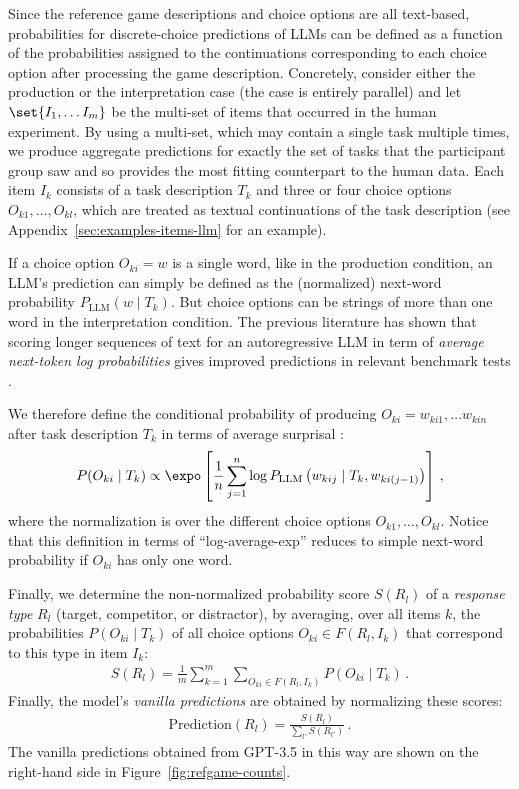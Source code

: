 \documentclass{article}
\begin{document}
Since the reference game descriptions and choice options are all text-based, probabilities for discrete-choice predictions of LLMs can be defined as a function of the probabilities assigned to the continuations corresponding to each choice option after processing the game description.
Concretely, consider either the production or the interpretation case (the case is entirely parallel) and let \(\set{I_1, \dots I_m}\) be the multi-set of items that occurred in the human experiment.
By using a multi-set, which may contain a single task multiple times, we produce aggregate predictions for exactly the set of tasks that the participant group saw and so provides the most fitting counterpart to the human data.
Each item $I_{k}$ consists of a task description $T_{k}$ and three or four choice options $O_{k1}, \dots, O_{kl}$, which are treated as textual continuations of the task description (see Appendix~\ref{sec:examples-items-llm} for an example).

If a choice option $O_{ki} = w$ is a single word, like in the production condition, an LLM's prediction can simply be defined as the (normalized) next-word probability $P_{\text{LLM}} (w \mid T_{k})$.
But choice options can be strings of more than one word in the interpretation condition.
The previous literature has shown that scoring longer sequences of text for an autoregressive LLM in term of \emph{average next-token log probabilities} gives improved predictions in relevant benchmark tests \citep[e.g.,][]{BrownMann2020:Language-Models}.

We therefore define the conditional probability of producing $O_{ki} = w_{ki1}, \dots w_{kin}$ after task description $T_{k}$ in terms of average surprisal :
%
\begin{align*}
P(O_{ki} \mid T_{k}) \propto \expo \left [  \frac{1}{n} \sum_{j=1}^n \log P_{\text{LLM}} \left(w_{kij} \mid T_{k}, w_{ki(j-1)} \right) \right ] \,,
\end{align*}
%
where the normalization is over the different choice options $O_{k1}, \dots, O_{kl}$.
Notice that this definition in terms of ``log-average-exp'' reduces to simple next-word probability if $O_{ki}$ has only one word.


Finally, we determine the non-normalized probability score $S(R_{l})$ of a \emph{response type} $R_{l}$ (target, competitor, or distractor), by averaging, over all items $k$, the probabilities $P(O_{ki} \mid T_{k})$ of all choice options $O_{ki} \in F(R_{l}, I_{k})$ that correspond to this type in item $I_{k}$:
%
\begin{align*}
S(R_{l}) = \frac{1}{m} \sum_{k=1}^{m} \sum_{O_{ki} \in F(R_{l}, I_{k})} P(O_{ki} \mid T_k)\,.
\end{align*}
%
Finally, the model's \textit{vanilla predictions} are obtained by normalizing these scores:
%
\begin{align*}
\text{Prediction}(R_{l}) = \frac{S(R_{l})}{\sum_{l'} S(R_{l'})}\,.
\end{align*}
%
The vanilla predictions obtained from GPT-3.5 in this way are shown on the right-hand side in Figure~\ref{fig:refgame-counts}.
\end{document}
